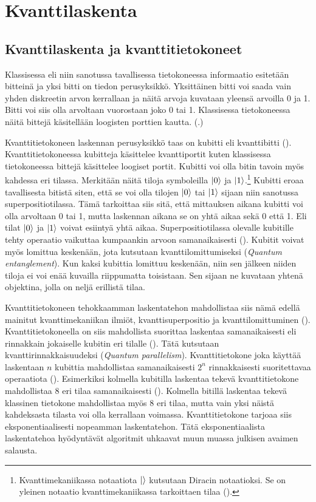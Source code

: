 \chapter{Kvanttilaskenta}

\section{Kvanttilaskenta ja kvanttitietokoneet}
Klassisessa eli niin sanotussa tavallisessa tietokoneessa informaatio esitetään bitteinä ja yksi bitti on tiedon perusyksikkö. Yksittäinen bitti voi saada vain yhden diskreetin arvon kerrallaan ja näitä arvoja kuvataan yleensä arvoilla 0 ja 1. Bitti voi siis olla arvoltaan vuorostaan joko 0 tai 1. Klassisessa tietokoneessa näitä bittejä käsitellään loogisten porttien kautta. (\cite{doi:10.1080/23742917.2016.1226650}.)

Kvanttitietokoneen laskennan perusyksikkö taas on kubitti eli kvanttibitti (\cite{doi:10.1080/23742917.2016.1226650}). Kvanttitietokoneessa kubitteja käsittelee kvanttiportit kuten klassisessa tietokoneessa bittejä käsittelee loogiset portit. Kubitti voi olla bitin tavoin myös kahdessa eri tilassa. Merkitään näitä tiloja symboleilla
$\ket{0}$ ja $\ket{1}$.\footnote{Kvanttimekaniikassa notaatiota $\ket{}$ kutsutaan Diracin notaatioksi. Se on yleinen notaatio kvanttimekaniikassa tarkoittaen tilaa (\cite{nielsen2001quantum}).} Kubitti eroaa tavallisesta bitistä siten, että se voi olla tilojen $\ket{0}$ tai $\ket{1}$ sijaan niin sanotussa superpositiotilassa. Tämä tarkoittaa siis sitä, että mittauksen aikana kubitti voi olla arvoltaan 0 tai 1, mutta laskennan aikana se on yhtä aikaa sekä 0 että 1. Eli tilat $\ket{0}$ ja $\ket{1}$ voivat esiintyä yhtä aikaa. Superpositiotilassa olevalle kubitille tehty operaatio vaikuttaa kumpaankin arvoon samanaikaisesti (\cite{mavroeidis2018impact}). Kubitit voivat myös lomittua keskenään, jota kutsutaan kvanttilomittumiseksi (\emph{Quantum entanglement}). Kun kaksi kubittia lomittuu keskenään, niin sen jälkeen niiden tiloja ei voi enää kuvailla riippumatta toisistaan. Sen sijaan ne kuvataan yhtenä objektina, jolla on neljä erillistä tilaa.

Kvanttitietokoneen tehokkaamman laskentatehon mahdollistaa siis nämä edellä mainitut kvanttimekaniikan ilmiöt, kvanttisuperpositio ja kvanttilomittuminen (\cite{mavroeidis2018impact}). Kvanttitietokoneella on siis mahdollista suorittaa laskentaa samanaikaisesti eli rinnakkain jokaiselle kubitin eri tilalle (\cite{doi:10.1080/23742917.2016.1226650}). Tätä kutsutaan kvanttirinnakkaisuudeksi (\emph{Quantum parallelism}). Kvanttitietokone joka käyttää laskentaan $n$ kubittia mahdollistaa samanaikaisesti $2^{n}$ rinnakkaisesti suoritettavaa operaatiota (\cite{mavroeidis2018impact}). Esimerkiksi kolmella kubitilla laskentaa tekevä kvanttitietokone mahdollistaa 8 eri tilaa samanaikaisesti (\cite{doi:10.1080/23742917.2016.1226650}). Kolmella bitillä laskentaa tekevä klassinen tietokone mahdollistaa myös 8 eri tilaa, mutta vain yksi näistä kahdeksasta tilasta voi olla kerrallaan voimassa.  Kvanttitietokone tarjoaa siis eksponentiaalisesti nopeamman laskentatehon. Tätä eksponentiaalista laskentatehoa hyödyntävät algoritmit uhkaavat muun muassa julkisen avaimen salausta.

